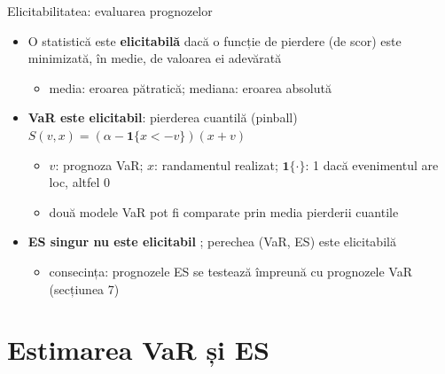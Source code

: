 \begin{frame}{Elicitabilitatea: evaluarea prognozelor}
\itemsize{\small}
\begin{itemize}
    \item O statistică este \textbf{elicitabilă} dacă o funcție de pierdere (de scor) este minimizată, în medie, de valoarea ei adevărată 
    \begin{itemize}
        \item media: eroarea pătratică; mediana: eroarea absolută
    \end{itemize}
    \item \textbf{VaR este elicitabil}: pierderea cuantilă (pinball) $S(v, x) = (\alpha - \mathbf{1}\{x < -v\})(x + v)$
    \begin{itemize}
        \item $v$: prognoza VaR; $x$: randamentul realizat; $\mathbf{1}\{\cdot\}$: 1 dacă evenimentul are loc, altfel 0
        \item două modele VaR pot fi comparate prin media pierderii cuantile
    \end{itemize}
    \item \textbf{ES singur nu este elicitabil} ; perechea (VaR, ES) este elicitabilă 
    \begin{itemize}
        \item consecința: prognozele ES se testează împreună cu prognozele VaR (secțiunea 7)
    \end{itemize}
\end{itemize}
\end{frame}


\section{Estimarea VaR și ES}

